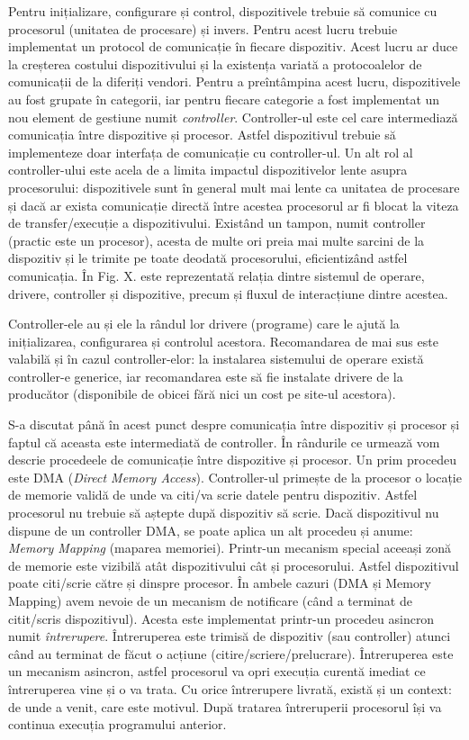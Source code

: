 Pentru inițializare, configurare și control, dispozitivele trebuie să comunice
cu procesorul (unitatea de procesare) și invers. Pentru acest lucru trebuie
implementat un protocol de comunicație în fiecare dispozitiv. Acest lucru ar
duce la creșterea costului dispozitivului și la existența variată a
protocoalelor de comunicații de la diferiți vendori. Pentru a preîntâmpina acest
lucru, dispozitivele au fost grupate în categorii, iar pentru fiecare categorie
a fost implementat un nou element de gestiune numit \textit{controller}. Controller-ul
este cel care intermediază comunicația între dispozitive și procesor. Astfel
dispozitivul trebuie să implementeze doar interfața de comunicație cu
controller-ul. Un alt rol al controller-ului este acela de a limita impactul
dispozitivelor lente asupra procesorului: dispozitivele sunt în general mult mai
lente ca unitatea de procesare și dacă ar exista comunicație directă între
acestea procesorul ar fi blocat la viteza de transfer/execuție a dispozitivului.
Existând un tampon, numit controller (practic este un procesor), acesta de multe
ori preia mai multe sarcini de la dispozitiv și le trimite pe toate deodată
procesorului, eficientizând astfel comunicația. În Fig. X. este reprezentată
relația dintre sistemul de operare, drivere, controller și dispozitive, precum
și fluxul de interacțiune dintre acestea.

Controller-ele au și ele la rândul lor drivere (programe) care le ajută la
inițializarea, configurarea și controlul acestora. Recomandarea de mai sus este
valabilă și în cazul controller-elor: la instalarea sistemului de operare există
controller-e generice, iar recomandarea este să fie instalate drivere de la
producător (disponibile de obicei fără nici un cost pe site-ul acestora).

S-a discutat până în acest punct despre comunicația între dispozitiv și procesor
și faptul că aceasta este intermediată de controller. În rândurile ce urmează
vom descrie procedeele de comunicație între dispozitive și procesor. Un prim
procedeu este DMA  (\textit{Direct Memory
Access}). Controller-ul primește de la procesor o locație de memorie validă de
unde va citi/va scrie datele pentru dispozitiv. Astfel procesorul nu trebuie să
aștepte după dispozitiv să scrie. Dacă dispozitivul nu dispune de un controller
DMA, se poate aplica un alt procedeu și anume: \textit{Memory Mapping} (maparea
memoriei). Printr-un mecanism special aceeași zonă de memorie este vizibilă atât
dispozitivului cât și procesorului. Astfel dispozitivul poate citi/scrie către
și dinspre procesor. În ambele cazuri (DMA și Memory Mapping) avem nevoie de un
mecanism de notificare (când a terminat de citit/scris dispozitivul). Acesta
este implementat printr-un procedeu asincron numit \textit{întrerupere}.
Întreruperea este trimisă de dispozitiv (sau controller) atunci când au terminat
de făcut o acțiune (citire/scriere/prelucrare). Întreruperea este un mecanism
asincron, astfel procesorul va opri execuția curentă imediat ce întreruperea
vine și o va trata. Cu orice întrerupere livrată, există și un context: de unde
a venit, care este motivul. După tratarea întreruperii procesorul își va
continua execuția programului anterior.


